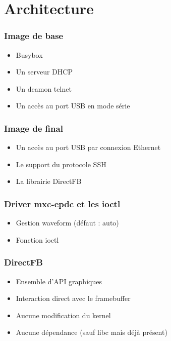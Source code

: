\section{Architecture}
\begin{frame}
\frametitle{Image de base}

\begin{itemize}
\item Busybox
\item Un serveur DHCP
\item Un deamon telnet
\item Un accès au port USB en mode série 
\end{itemize}

\end{frame}

\begin{frame}
\frametitle{Image de final}

\begin{itemize}
\item Un accès au port USB par connexion Ethernet
\item Le support du protocole SSH
\item La librairie DirectFB
\end{itemize}

\end{frame}

\begin{frame}
\frametitle{Driver mxc-epdc et les ioctl}

\begin{itemize}
\item Gestion waveform (défaut : auto)
\item Fonction ioctl
\end{itemize}

\end{frame}

\begin{frame}
\frametitle{DirectFB}

\begin{itemize}
\item Ensemble d'API graphiques
\item Interaction direct avec le framebuffer 
\item Aucune modification du kernel
\item Aucune dépendance (sauf libc mais déjà présent)
\end{itemize}

\end{frame}

